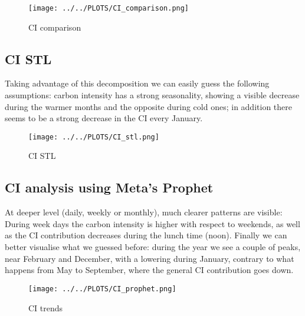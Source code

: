 \begin{figure}[H]
\centering
\texttt{[image: ../../PLOTS/CI\_comparison.png]}
\captionsetup{skip=-10pt}
\caption{CI comparison}
\label{CI_comparison}
\end{figure}

\subsection{CI STL}
Taking advantage of this decomposition we can easily guess the following assumptions: carbon intensity has a strong seasonality, showing a visible decrease during the warmer months and the opposite during cold ones; in addition there seems to be a strong decrease in the CI every January.

\vspace{-15pt}

\begin{figure}[H]
\centering
\texttt{[image: ../../PLOTS/CI\_stl.png]}
\caption{CI STL}
\label{CI_stl}
\end{figure}

\subsection{CI analysis using Meta's Prophet}
At deeper level (daily, weekly or monthly), much clearer patterns are visible: \\
During week days the carbon intensity is higher with respect to weekends, as well as the CI contribution decreases during the lunch time (noon). Finally we can better visualise what we guessed before: during the year we see a couple of peaks, near February and December, with a lowering during January, contrary to what happens from May to September, where the general CI contribution goes down.

\vspace{-15pt}

\begin{figure}[H]
\centering
\texttt{[image: ../../PLOTS/CI\_prophet.png]}
\caption{CI trends}
\label{CI_prophet}
\end{figure}